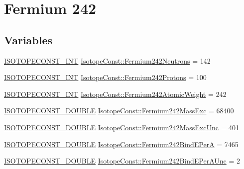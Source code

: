 \hypertarget{group___isotope_const-_fermium-_fm242}{}\section{Fermium 242}
\label{group___isotope_const-_fermium-_fm242}
\subsection*{Variables}
\begin{DoxyCompactItemize}
\item 
\mbox{\hyperlink{group___isotope_const-_macros_ga5f18360b3e99483a35c32d789e62621c}{I\+S\+O\+T\+O\+P\+E\+C\+O\+N\+S\+T\+\_\+\+I\+NT}} \mbox{\hyperlink{group___isotope_const-_fermium-_fm242_gaef2329c2936f50912dbbb7a69b75b5c8}{Isotope\+Const\+::\+Fermium242\+Neutrons}} = 142
\item 
\mbox{\hyperlink{group___isotope_const-_macros_ga5f18360b3e99483a35c32d789e62621c}{I\+S\+O\+T\+O\+P\+E\+C\+O\+N\+S\+T\+\_\+\+I\+NT}} \mbox{\hyperlink{group___isotope_const-_fermium-_fm242_gade25a307a18245006a1791c5d490c622}{Isotope\+Const\+::\+Fermium242\+Protons}} = 100
\item 
\mbox{\hyperlink{group___isotope_const-_macros_ga5f18360b3e99483a35c32d789e62621c}{I\+S\+O\+T\+O\+P\+E\+C\+O\+N\+S\+T\+\_\+\+I\+NT}} \mbox{\hyperlink{group___isotope_const-_fermium-_fm242_ga52fb0e3a03be7472bad61032c9354725}{Isotope\+Const\+::\+Fermium242\+Atomic\+Weight}} = 242
\item 
\mbox{\hyperlink{group___isotope_const-_macros_ga8f45a7272ce02c0b4c65c44636ed719a}{I\+S\+O\+T\+O\+P\+E\+C\+O\+N\+S\+T\+\_\+\+D\+O\+U\+B\+LE}} \mbox{\hyperlink{group___isotope_const-_fermium-_fm242_gab0e70e2ff6352c243e93101c7f06bc91}{Isotope\+Const\+::\+Fermium242\+Mass\+Exc}} = 68400
\item 
\mbox{\hyperlink{group___isotope_const-_macros_ga8f45a7272ce02c0b4c65c44636ed719a}{I\+S\+O\+T\+O\+P\+E\+C\+O\+N\+S\+T\+\_\+\+D\+O\+U\+B\+LE}} \mbox{\hyperlink{group___isotope_const-_fermium-_fm242_gad1e05b8c17b6737ec32d075ee09e94ec}{Isotope\+Const\+::\+Fermium242\+Mass\+Exc\+Unc}} = 401
\item 
\mbox{\hyperlink{group___isotope_const-_macros_ga8f45a7272ce02c0b4c65c44636ed719a}{I\+S\+O\+T\+O\+P\+E\+C\+O\+N\+S\+T\+\_\+\+D\+O\+U\+B\+LE}} \mbox{\hyperlink{group___isotope_const-_fermium-_fm242_gabc08743c9784c466c9f127fc03195865}{Isotope\+Const\+::\+Fermium242\+Bind\+E\+PerA}} = 7465
\item 
\mbox{\hyperlink{group___isotope_const-_macros_ga8f45a7272ce02c0b4c65c44636ed719a}{I\+S\+O\+T\+O\+P\+E\+C\+O\+N\+S\+T\+\_\+\+D\+O\+U\+B\+LE}} \mbox{\hyperlink{group___isotope_const-_fermium-_fm242_gaead7cfbc40007c559adcbf7bde6691c1}{Isotope\+Const\+::\+Fermium242\+Bind\+E\+Per\+A\+Unc}} = 2

\end{DoxyCompactItemize}
